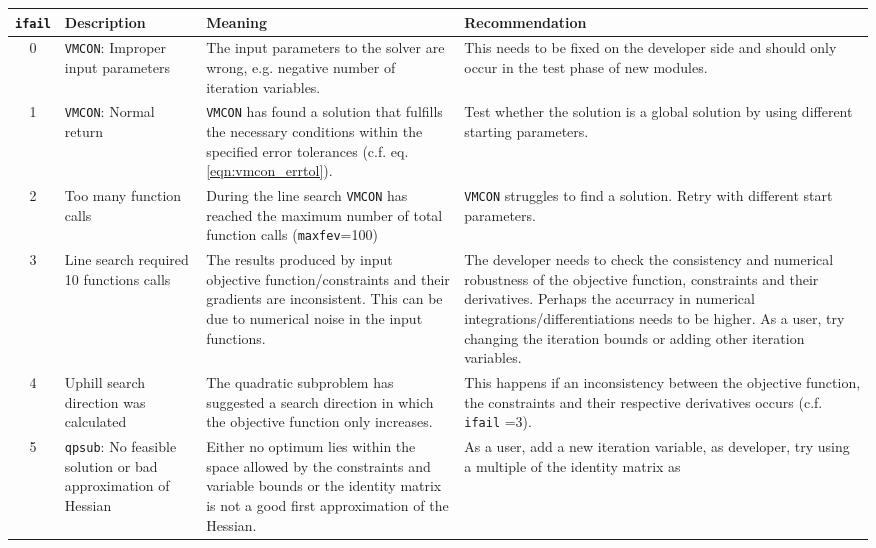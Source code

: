 \documentclass[11pt,a4paper]{report}
\newcommand{\ifail}{\mbox{\texttt{ifail}}}
\newcommand{\vmcon}{\mbox{\texttt{VMCON}}}
\begin{document}
\begin{table}
\footnotesize
\begin{center}
\begin{tabular}{|c|p{2.7cm}|p{3.4cm}|p{3.4cm}|}
  \hline
  \ifail\/ & Description & Meaning & Recommendation \\
  \hline
  \colorbox{red!20}{ 0 }&\vmcon: Improper input parameters & The input
  parameters to the solver are wrong, e.g. negative number of iteration
  variables. & This needs to be fixed on the developer side and should only
  occur in the test phase of new modules. \\
  \hline
  \colorbox{green!20}{ 1 } &\vmcon: Normal return & \vmcon\/ has found a
  solution that fulfills the necessary conditions within the specified error
  tolerances (c.f. eq. \ref{eqn:vmcon_errtol}). & Test whether the solution is
  a global solution by using different starting parameters.\\
  \hline
  \colorbox{red!20}{ 2 } & Too many function calls & During the line search
  \vmcon\/ has reached the maximum number of total function calls
  (\texttt{maxfev}=100)  & \vmcon\/ struggles to find a solution. Retry with
  different start parameters. \\
  \hline
  \colorbox{red!20}{ 3 } & Line search required 10 functions calls & The
  results produced by input objective function/constraints and  their
  gradients are inconsistent. This can be due to numerical noise in the input
  functions. & The developer needs to check the consistency and numerical
  robustness of the objective function, constraints and their
  derivatives. Perhaps the accurracy in numerical
  integrations/differentiations needs to be higher. As a user, try changing
  the iteration bounds or adding other iteration variables. \\
  \hline
  \colorbox{red!20}{ 4 } & Uphill search direction was calculated & The
  quadratic subproblem has suggested a search direction in which the objective
  function only increases.  & This happens if an inconsistency between the
  objective function, the constraints and their respective derivatives occurs
  (c.f. \ifail\/ =3).\\
  \hline
  \colorbox{red!20}{ 5 }&\texttt{qpsub}: No feasible solution or bad
  approximation of Hessian & Either no optimum lies within the space allowed
  by the constraints and variable bounds or the identity matrix is not a good
  first approximation of the Hessian. & As a user, add a new iteration
  variable, as developer, try using a multiple of the identity matrix as

\end{tabular}
\end{center}
\end{table}
\end{document}
